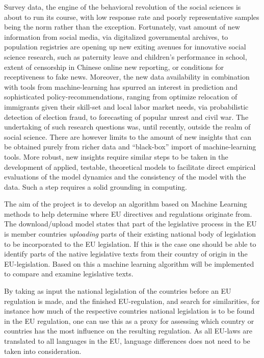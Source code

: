 \documentclass[%
oneside,                 %
final,                   %
10pt]{article}
\begin{document}
Survey data, the engine of the behavioral revolution of the social
sciences is about to run its course, with low response rate and poorly
representative samples being the norm rather than the
exception. Fortunately, vast amount of new information from social
media, via digitalized governmental archives, to population registries
are opening up new exiting avenues for innovative social science
research, such as paternity leave and children’s performance in
school, extent of censorship in Chinese online new reporting, or
conditions for receptiveness to fake news. Moreover, the new data
availability in combination with tools from machine-learning has
spurred an interest in prediction and sophisticated
policy-recommendations, ranging from optimize relocation of immigrants
given their skill-set and local labor market needs, via probabilistic
detection of election fraud, to forecasting of popular unrest and
civil war. The undertaking of such research questions was, until
recently, outside the realm of social science. There are however
limits to the amount of new insights that can be obtained purely from
richer data and “black-box” import of machine-learning tools. More
robust, new insights require similar steps to be taken in the
development of applied, testable, theoretical models to facilitate
direct empirical evaluations of the model dynamics and the consistency
of the model with the data. Such a step requires a solid grounding in
computing.


The aim of the project is to develop an algorithm based on Machine
Learning methods to help determine where EU directives and regulations
originate from. The download/upload model states that part of the
legislative process in the EU is member countries \emph{uploading} parts of
their existing national body of legislation to be incorporated to the
EU legislation.  If this is the case one should be able to identify
parts of the native legislative texts from their country of origin in
the EU-legislation. Based on this a machine learning algorithm will be
implemented to compare and examine legislative texts.

By taking as input the national legislation of the countries before an
EU regulation is made, and the finished EU-regulation, and search for
similarities, for instance how much of the respective countries
national legislation is to be found in the EU regulation, one can use
this as a proxy for assessing which country or countries has the most
influence on the resulting regulation. As all EU-laws are translated
to all languages in the EU, language differences does not need to be
taken into consideration.
\end{document}

